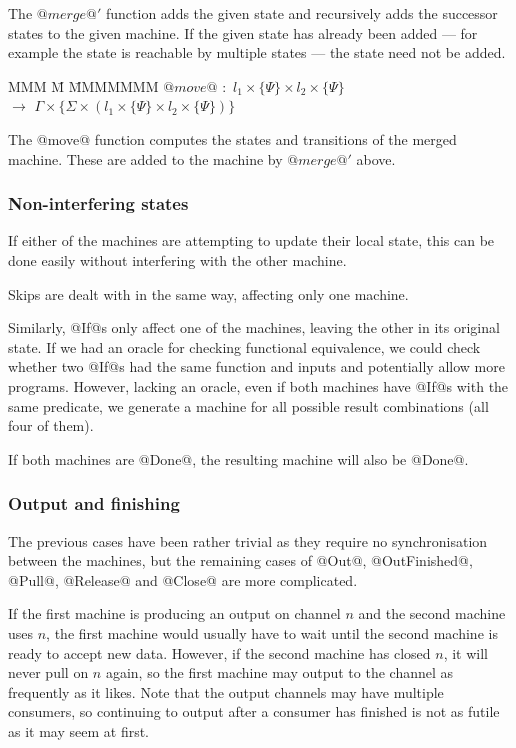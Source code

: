 The $@merge@'$ function adds the given state and recursively adds the successor states to the given machine.
If the given state has already been added --- for example the state is reachable by multiple states --- the state need not be added.

\begin{tabbing}
MMM \= M \= MMMMMMM\kill
$@move@$ \> $:$ \> $l_1 \times \{\Psi\} \times l_2 \times \{\Psi\}$ \\
           \> $\to$ \> $\Gamma \times \{\Sigma \times (l_1 \times \{\Psi\} \times l_2 \times \{\Psi\})\}$ \\
\end{tabbing}

The @move@ function computes the states and transitions of the merged machine.
These are added to the machine by $@merge@'$ above.



\subsubsection{Non-interfering states}
If either of the machines are attempting to update their local state, this can be done easily without interfering with the other machine.

Skips are dealt with in the same way, affecting only one machine.

Similarly, @If@s only affect one of the machines, leaving the other in its original state.
If we had an oracle for checking functional equivalence, we could check whether two @If@s had the same function and inputs and potentially allow more programs.
However, lacking an oracle, even if both machines have @If@s with the same predicate, we generate a machine for all possible result combinations (all four of them).

If both machines are @Done@, the resulting machine will also be @Done@.

\subsubsection{Output and finishing}
The previous cases have been rather trivial as they require no synchronisation between the machines, but the remaining cases of @Out@, @OutFinished@, @Pull@, @Release@ and @Close@ are more complicated.

If the first machine is producing an output on channel $n$ and the second machine uses $n$, the first machine would usually have to wait until the second machine is ready to accept new data.
However, if the second machine has closed $n$, it will never pull on $n$ again, so the first machine may output to the channel as frequently as it likes.
Note that the output channels may have multiple consumers, so continuing to output after a consumer has finished is not as futile as it may seem at first.

